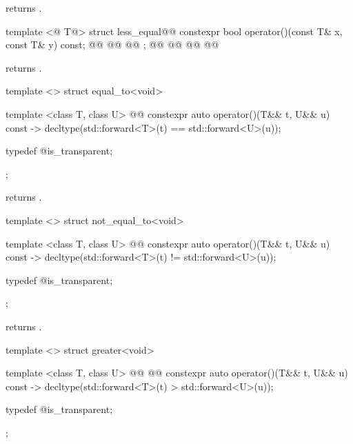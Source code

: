 \begin{itemdescr}
\pnum
{} returns .
\end{itemdescr}

%
\begin{itemdecl}
template <@ T@>
struct less_equal@@ {
  constexpr bool operator()(const T& x, const T& y) const;
  @@
  @@
  @@
};
@@
@@
  @@
@\added{\};}@
\end{itemdecl}

\begin{itemdescr}
\pnum
{} returns .
\end{itemdescr}

%
\begin{itemdecl}
template <> struct equal_to<void> {
  template <class T, class U>
    @@
  constexpr auto operator()(T&& t, U&& u) const
    -> decltype(std::forward<T>(t) == std::forward<U>(u));

  typedef @\unspec@ is_transparent;
};
\end{itemdecl}

\begin{itemdescr}
\pnum
{} returns .
\end{itemdescr}

%
\begin{itemdecl}
template <> struct not_equal_to<void> {
  template <class T, class U>
    @@
  constexpr auto operator()(T&& t, U&& u) const
    -> decltype(std::forward<T>(t) != std::forward<U>(u));

  typedef @\unspec@ is_transparent;
};
\end{itemdecl}

\begin{itemdescr}
\pnum
{} returns .
\end{itemdescr}

%
\begin{itemdecl}
template <> struct greater<void> {
  template <class T, class U>
    @@
      @@
  constexpr auto operator()(T&& t, U&& u) const
    -> decltype(std::forward<T>(t) > std::forward<U>(u));

  typedef @\unspec@ is_transparent;
};
\end{itemdecl}

